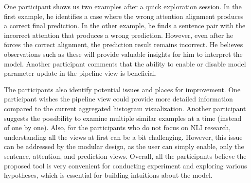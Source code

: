 One participant shows us two examples after a quick exploration session. 
In the first example, he identifies a case where the wrong attention alignment produces a correct final prediction.
%
In the other example, he finds a sentence pair with the incorrect attention that produces a wrong prediction. 
However, even after he forces the correct alignment, the prediction result remains incorrect. He believes observations such as these will provide valuable insights for him to interpret the model. 
%
Another participant comments that the ability to enable or disable model parameter update in the pipeline view is beneficial.

The participants also identify potential issues and places for improvement. 
One participant wishes the pipeline view could provide more detailed information compared to the current aggregated histogram visualization. 
Another participant suggests the possibility to examine multiple similar examples at a time (instead of one by one). 
%
Also, for the participants who do not focus on NLI research, understanding all the views at first can be a bit challenging. However, this issue can be addressed by the modular design, as the user can simply enable, only the sentence, attention, and prediction views.
%
Overall, all the participants believe the proposed tool is very convenient for conducting experiment and exploring various hypotheses, which is essential for building intuitions about the model.



